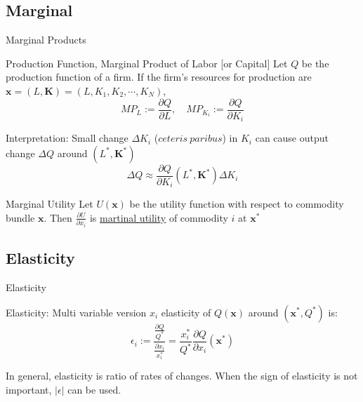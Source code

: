 \documentclass[a4paper,11pt]{article}
\newcommand{\bd}{\mathbf}
\newcommand{\p}{\partial}
\begin{document}
\subsection{Marginal } %
\label{sub:marginal_products}
\begin{frame}[t]{Marginal Products}
	\begin{block}
		{Production Function, Marginal Product of Labor [or Capital]}
		Let $Q$ be the production function of a firm. If the firm's resources for production are $\bd{x}=(L,\bd{K})=(L,K_1,K_2,\cdots,K_N)$, \[
			MP_L:= \frac{\p Q}{\p L},\quad MP_{K_i}:=\frac{\p Q}{\p K_i}
		\]
	\end{block}
	Interpretation: Small change $\Delta K_i$ ($ceteris~paribus$) in $K_i$ can cause output change $\Delta Q$ around $(L^\ast,\bd{K}^\ast)$
	\[
		\Delta Q \approx \frac{\p Q}{\p K_i} (L^\ast,\bd{K}^\ast) \Delta K_i
	\] 
	\begin{block}
		{Marginal Utility}
		Let $U(\bd{x})$ be the utility function with respect to commodity bundle $\bd{x}$. Then $\frac{\p U}{\p x_i}$ is \uline{martinal utility} of commodity $i$ at $\bd x^\ast$
	\end{block}
\end{frame}
\subsection{Elasticity} %
\label{sub:elasticity}
\begin{frame}[t]{Elasticity}
	\begin{block}
		{Elasticity: Multi variable version} $x_i$ elasticity of $Q(\bd x)$ around $(\bd{x}^\ast,Q^\ast)$ is:\[
			\epsilon_i := \frac{\frac{\p Q}{Q^\ast}}{\frac{\p x_i}{ x_i^\ast}} = \frac{x_i^\ast}{Q^\ast}\frac{\p Q}{\p x_i}(\bd{x}^\ast)
		\]
	\end{block}
	In general, elasticity is ratio of rates of changes. When the sign of elasticity is not important, $|\epsilon|$ can be used. 
\end{frame}
\end{document}
